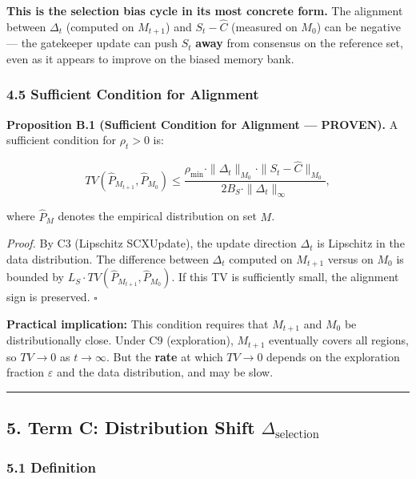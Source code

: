 \documentclass[
  12pt,
]{ctexart}
\begin{document}
\textbf{This is the selection bias cycle in its most concrete form.} The
alignment between \(\Delta_t\) (computed on \(M_{t+1}\)) and
\(S_t - \hat{C}\) (measured on \(M_0\)) can be negative --- the
gatekeeper update can push \(S_t\) \textbf{away} from consensus on the
reference set, even as it appears to improve on the biased memory bank.

\subsubsection{4.5 Sufficient Condition for
Alignment}\label{sufficient-condition-for-alignment}

\textbf{Proposition B.1 (Sufficient Condition for Alignment ---
PROVEN).} A sufficient condition for \(\rho_t > 0\) is:

\[TV(\hat{P}_{M_{t+1}}, \hat{P}_{M_0}) \leq \frac{\rho_{\min} \cdot \|\Delta_t\|_{M_0} \cdot \|S_t - \hat{C}\|_{M_0}}{2 B_S \cdot \|\Delta_t\|_\infty},\]

where \(\hat{P}_{M}\) denotes the empirical distribution on set \(M\).

\emph{Proof.} By C3 (Lipschitz SCXUpdate), the update direction
\(\Delta_t\) is Lipschitz in the data distribution. The difference
between \(\Delta_t\) computed on \(M_{t+1}\) versus on \(M_0\) is
bounded by \(L_S \cdot TV(\hat{P}_{M_{t+1}}, \hat{P}_{M_0})\). If this
TV is sufficiently small, the alignment sign is preserved. \(\square\)

\textbf{Practical implication:} This condition requires that \(M_{t+1}\)
and \(M_0\) be distributionally close. Under C9 (exploration),
\(M_{t+1}\) eventually covers all regions, so \(TV \to 0\) as
\(t \to \infty\). But the \textbf{rate} at which \(TV \to 0\) depends on
the exploration fraction \(\varepsilon\) and the data distribution, and
may be slow.

\begin{center}\rule{0.5\linewidth}{0.5pt}\end{center}

\subsection{\texorpdfstring{5. Term C: Distribution Shift
\(\Delta_{\text{selection}}\)}{5. Term C: Distribution Shift \textbackslash Delta\_\{\textbackslash text\{selection\}\}}}\label{term-c-distribution-shift-delta_textselection}

\subsubsection{5.1 Definition}\label{definition}
\end{document}
